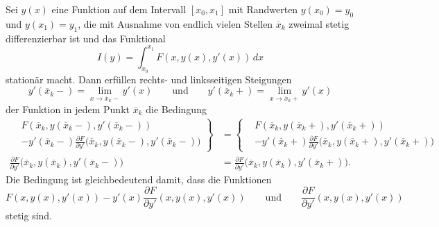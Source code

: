 \begin{satz}
\label{buch:nichtdiff:splines:satz:weierstrass-erdmann}
Sei $y(x)$ eine Funktion auf dem Intervall $[x_0,x_1]$ mit Randwerten
$y(x_0)=y_0$ und $y(x_1)=y_1$, die mit Ausnahme von endlich
vielen Stellen $\overline{x}_k$ zweimal
stetig differenzierbar ist und das Funktional
\[
I(y)
=
\int_{x_0}^{x_1}
F(x,y(x),y'(x))
\,dx
\]
stationär macht.
Dann erfüllen rechts- und linksseitigen Steigungen
\[
y'(\overline{x}_k-) = \lim_{x\to \overline{x}_k-} y'(x)
\qquad\text{und}\qquad
y'(\overline{x}_k+) = \lim_{x\to \overline{x}_k+} y'(x)
\]
der Funktion in jedem Punkt $\overline{x}_k$ die Bedingung
\begin{equation}
\begin{aligned}
\left.
\begin{aligned}
&F(\overline{x}_k,y(\overline{x}_k-),y'(\overline{x}_k-))
\\
&- 
y'(\overline{x}_k-)
\frac{\partial F}{\partial y'}\bigl(\overline{x}_k,y(\overline{x}_k-), y'(\overline{x}_k-)\bigr)
\end{aligned}\right\}
&=
\left\{
\begin{aligned}
&F(\overline{x}_k,y(\overline{x}_k+),y'(\overline{x}_k+))
\\
&- 
y'(\overline{x}_k+)
\frac{\partial F}{\partial y'}\bigl(\overline{x}_k,y(\overline{x}_k+), y'(\overline{x}_k+)\bigr)
\end{aligned}
\right.
\\
\frac{\partial F}{\partial y'}\bigl(
\overline{x}_k,
y(\overline{x}_k),
y'(\overline{x}_k-)
\bigr)
&=
\frac{\partial F}{\partial y'}\bigl(
\overline{x}_k,
y(\overline{x}_k),
y'(\overline{x}_k+)
\bigr).
\end{aligned}
\label{buch:nichtdiff:eckenedingung:eqn:we}
\end{equation}
Die Bedingung ist gleichbedeutend damit, dass die Funktionen
\[
F(x,y(x),y'(x))-y'(x)\frac{\partial F}{\partial y'}(x,y(x),y'(x))
\qquad\text{und}\qquad
\frac{\partial F}{\partial y'}(x,y(x),y'(x))
\]
stetig sind.
\end{satz}


